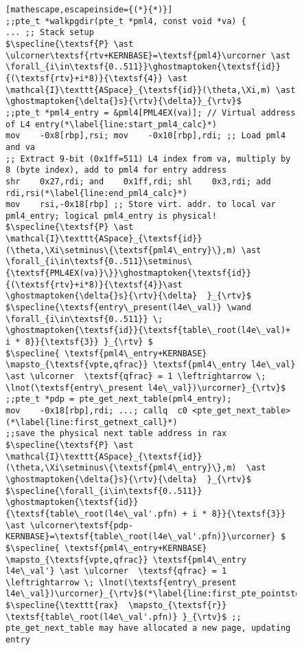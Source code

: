 \begin{figure}\footnotesize
\ifPLDI
\begin{lstlisting}[mathescape,escapeinside={(*}{*)}]
;;pte_t *walkpgdir(pte_t *pml4, const void *va) {
... ;; Stack setup
$\specline{\textsf{P} \ast \ulcorner\textsf{rtv+KERNBASE}=\textsf{pml4}\urcorner \ast \forall_{i\in\textsf{0..511}}\ghostmaptoken{\textsf{id}}{(\textsf{rtv}+i*8)}{\textsf{4}} \ast \mathcal{I}\texttt{ASpace}_{\textsf{id}}(\theta,\Xi,m) \ast \ghostmaptoken{\delta{}s}{\rtv}{\delta}}_{\rtv}$
;;pte_t *pml4_entry = &pml4[PML4EX(va)]; // Virtual address of L4 entry(*\label{line:start_pml4_calc}*)
mov    -0x8[rbp],rsi; mov    -0x10[rbp],rdi; ;; Load pml4 and va
;; Extract 9-bit (0x1ff=511) L4 index from va, multiply by 8 (byte index), add to pml4 for entry address
shr    0x27,rdi; and    0x1ff,rdi; shl    0x3,rdi; add    rdi,rsi(*\label{line:end_pml4_calc}*)
mov    rsi,-0x18[rbp] ;; Store virt. addr. to local var pml4_entry; logical pml4_entry is physical!
$\specline{\textsf{P} \ast \mathcal{I}\texttt{ASpace}_{\textsf{id}}(\theta,\Xi\setminus\{\textsf{pml4\_entry}\},m) \ast \forall_{i\in\textsf{0..511}\setminus\{\textsf{PML4EX(va)}\}}\ghostmaptoken{\textsf{id}}{(\textsf{rtv}+i*8)}{\textsf{4}}\ast \ghostmaptoken{\delta{}s}{\rtv}{\delta}  }_{\rtv}$
$\specline{\textsf{entry\_present(l4e\_val)} \wand \forall_{i\in\textsf{0..511}} \; \ghostmaptoken{\textsf{id}}{\textsf{table\_root(l4e\_val)+ i * 8}}{\textsf{3}} }_{\rtv} $
$\specline{ \textsf{pml4\_entry+KERNBASE} \mapsto_{\textsf{vpte,qfrac}} \textsf{pml4\_entry l4e\_val} \ast \ulcorner  \textsf{qfrac} = 1 \leftrightarrow \; \lnot(\textsf{entry\_present l4e\_val})\urcorner}_{\rtv}$    
;;pte_t *pdp = pte_get_next_table(pml4_entry);
mov    -0x18[rbp],rdi; ...; callq  c0 <pte_get_next_table>(*\label{line:first_getnext_call}*)
;;save the physical next table address in rax
$\specline{\textsf{P} \ast \mathcal{I}\texttt{ASpace}_{\textsf{id}}(\theta,\Xi\setminus\{\textsf{pml4\_entry}\},m)  \ast \ghostmaptoken{\delta{}s}{\rtv}{\delta}  }_{\rtv}$
$\specline{\forall_{i\in\textsf{0..511}} \ghostmaptoken{\textsf{id}}{\textsf{table\_root(l4e\_val'.pfn) + i * 8}}{\textsf{3}}  \ast \ulcorner\textsf{pdp-KERNBASE}=\textsf{table\_root(l4e\_val'.pfn)}\urcorner} $
$\specline{ \textsf{pml4\_entry+KERNBASE} \mapsto_{\textsf{vpte,qfrac}} \textsf{pml4\_entry l4e\_val'} \ast \ulcorner  \textsf{qfrac} = 1 \leftrightarrow \; \lnot(\textsf{entry\_present l4e\_val})\urcorner}_{\rtv}$(*\label{line:first_pte_pointsto}*)
$\specline{\texttt{rax}  \mapsto_{\textsf{r}} \textsf{table\_root(l4e\_val'.pfn)} }_{\rtv}$ ;; pte_get_next_table may have allocated a new page, updating entry

\end{lstlisting}
\end{figure}
